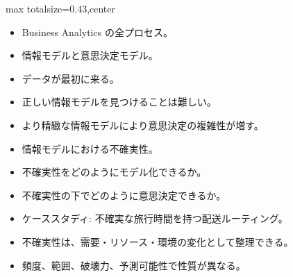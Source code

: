 \clearpage
{}
\begin{minipage}[t]{0.405\textwidth}
\begin{adjustbox}{max totalsize={\textwidth}{0.43\textheight},center}
\begin{minipage}{\textwidth}\scriptsize
{}\begin{itemize}
\item Business Analytics の全プロセス。
\item 情報モデルと意思決定モデル。
\item データが最初に来る。
\item 正しい情報モデルを見つけることは難しい。
\item より精緻な情報モデルにより意思決定の複雑性が増す。
\item 情報モデルにおける不確実性。
\item 不確実性をどのようにモデル化できるか。
\item 不確実性の下でどのように意思決定できるか。
\item ケーススタディ: 不確実な旅行時間を持つ配送ルーティング。
\end{itemize}\begin{itemize}
\item 不確実性は、需要・リソース・環境の変化として整理できる。
\item 頻度、範囲、破壊力、予測可能性で性質が異なる。
\end{itemize}
\end{minipage}
\end{adjustbox}
\end{minipage}\hfill
